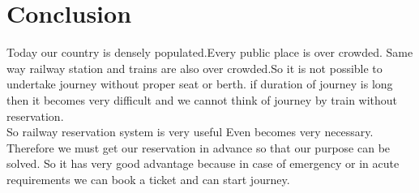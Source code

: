 \documentclass{article}
\begin{document}
\section{Conclusion}
Today our country is densely populated.Every public place is over crowded. Same way railway station and trains are also over crowded.So it is not possible to undertake journey without proper seat or berth. if duration of journey is long then it becomes very difficult and we cannot think of journey by train without reservation.\\So railway reservation system is very useful Even becomes very necessary. Therefore we must get our reservation in advance so that our purpose can be solved. So it has very good advantage because in case of emergency or in acute requirements we can book a ticket and can start journey.
\end{document}
